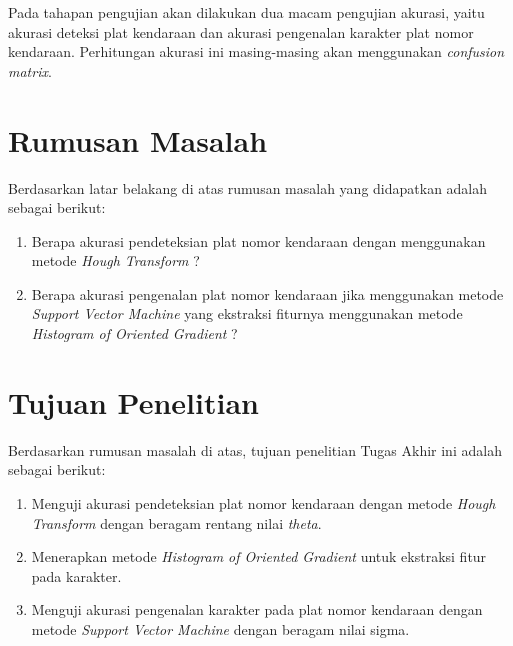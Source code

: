 \noindent Pada tahapan pengujian akan dilakukan dua macam pengujian akurasi, yaitu akurasi deteksi plat kendaraan dan akurasi pengenalan karakter plat nomor kendaraan. Perhitungan akurasi ini masing-masing akan menggunakan \textit{confusion matrix}.\\

\section{Rumusan Masalah}
\noindent Berdasarkan latar belakang di atas rumusan masalah yang didapatkan adalah sebagai berikut:
\begin{enumerate}[nolistsep,leftmargin=0.5cm]
\item Berapa akurasi pendeteksian plat nomor kendaraan dengan menggunakan metode \textit{Hough Transform} ?
\item Berapa akurasi pengenalan plat nomor kendaraan jika menggunakan metode \textit{Support Vector Machine} yang ekstraksi fiturnya menggunakan metode \textit{Histogram of Oriented Gradient} ? \\
\end{enumerate}

\section{Tujuan Penelitian}
\noindent Berdasarkan rumusan masalah di atas, tujuan penelitian Tugas Akhir ini adalah sebagai berikut:
\begin{enumerate}[nolistsep,leftmargin=0.5cm]
\item Menguji akurasi pendeteksian plat nomor kendaraan dengan metode \textit{Hough Transform} dengan beragam rentang nilai \textit{theta}.
\item Menerapkan metode \textit{Histogram of Oriented Gradient} untuk ekstraksi fitur pada karakter.
\item Menguji akurasi pengenalan karakter pada plat nomor kendaraan dengan metode \textit{Support Vector Machine} dengan beragam nilai sigma.\\
\end{enumerate}

